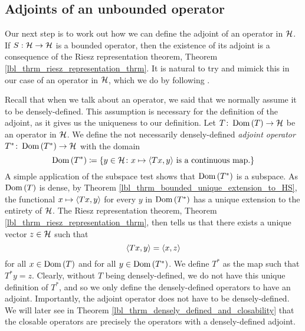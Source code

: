 \subsection{Adjoints of an unbounded operator}\label{lbl_sec_adjoints}

Our next step is to work out how we can define the adjoint of an operator in $\mathcal{H}$. If $S: \mathcal{H} \to \mathcal{H}$ is a bounded operator, then the existence of its adjoint is a consequence of the Riesz representation theorem, Theorem \eqref{lbl_thrm_riesz_representation_thrm}. It is natural to try and mimick this in our case of an operator in $\mathcal{H}$, which we do by following {\cite[Definition 5.1.2]{analysis_now}}.

\medskip

Recall that when we talk about an operator, we said that we normally assume it to be densely-defined. This assumption is necessary for the definition of the adjoint, as it gives us the uniqueness to our definition. Let $T \colon \operatorname{Dom}\left(T\right) \to \mathcal{H}$ be an operator in $\mathcal{H}$. We define the not necessarily densely-defined {\emph{adjoint operator}} $T^* \colon \operatorname{Dom}\left(T^*\right) \to \mathcal{H}$ with the domain
\begin{equation*}
  \operatorname{Dom}\left(T^*\right) \coloneqq \left\{y \in \mathcal{H} \colon x \mapsto \left\langle Tx, y\right\rangle \, \text{is a continuous map}.\right\}
\end{equation*}
A simple application of the subspace test shows that $\operatorname{Dom}\left(T^*\right)$ is a subspace. As $\operatorname{Dom}\left(T\right)$ is dense, by Theorem \eqref{lbl_thrm_bounded_unique_extension_to_HS}, the functional $x \mapsto \left\langle Tx, y\right\rangle$ for every $y$ in $\operatorname{Dom}\left(T^*\right)$ has a unique extension to the entirety of $\mathcal{H}$. The Riesz representation theorem, Theorem \eqref{lbl_thrm_riesz_representation_thrm}, then tells us that there exists a unique vector $z \in \mathcal{H}$ such that
\begin{equation*}
  \left\langle Tx, y\right\rangle = \left\langle x, z\right\rangle
\end{equation*}
for all $x \in \operatorname{Dom}\left(T\right)$ and for all $y \in \operatorname{Dom}\left(T^*\right)$. We define $T^*$ as the map such that $T^*y = z$. Clearly, without $T$ being densely-defined, we do not have this unique definition of $T^*$, and so we only define the densely-defined operators to have an adjoint. Importantly, the adjoint operator does not have to be densely-defined. We will later see in Theorem \eqref{lbl_thrm_densely_defined_and_closability} that the closable operators are precisely the operators with a densely-defined adjoint.

